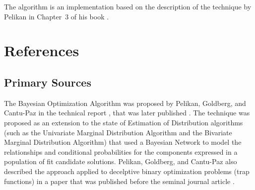\documentclass[a4paper, 11pt]{article}
\begin{document}
The algorithm is an implementation based on the description of the technique by Pelikan in Chapter~3 of his book \cite{Pelikan2005a}.




\section{References}
\label{sec:references}

% 
% 
\subsection{Primary Sources}
The Bayesian Optimization Algorithm was proposed by Pelikan, Goldberg, and Cantu-Paz in the technical report \cite{Pelikan1998a}, that was later published \cite{Pelikan2002}. The technique was proposed as an extension to the state of Estimation of Distribution algorithms (such as the Univariate Marginal Distribution Algorithm and the Bivariate Marginal Distribution Algorithm) that used a Bayesian Network to model the relationships and conditional probabilities for the components expressed in a population of fit candidate solutions.
Pelikan, Goldberg, and Cantu-Paz also described the approach applied to decelptive binary optimization problems (trap functions) in a paper that was published before the seminal journal article \cite{Pelikan1999a}.

% 
% 
\end{document}
